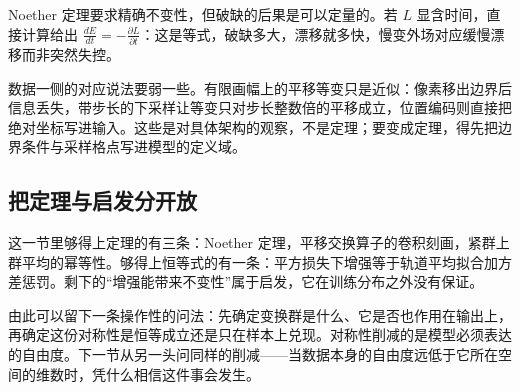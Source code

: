 Noether 定理要求精确不变性，但破缺的后果是可以定量的。若 \(L\) 显含时间，直接计算给出 \(\frac{dE}{dt}=-\frac{\partial L}{\partial t}\)：这是等式，破缺多大，漂移就多快，慢变外场对应缓慢漂移而非突然失控。

\begin{remark}
数据一侧的对应说法要弱一些。有限画幅上的平移等变只是近似：像素移出边界后信息丢失，带步长的下采样让等变只对步长整数倍的平移成立，位置编码则直接把绝对坐标写进输入。这些是对具体架构的观察，不是定理；要变成定理，得先把边界条件与采样格点写进模型的定义域。
\end{remark}

\subsection{把定理与启发分开放}

这一节里够得上定理的有三条：Noether 定理，平移交换算子的卷积刻画，紧群上群平均的幂等性。够得上恒等式的有一条：平方损失下增强等于轨道平均拟合加方差惩罚。剩下的``增强能带来不变性''属于启发，它在训练分布之外没有保证。

由此可以留下一条操作性的问法：先确定变换群是什么、它是否也作用在输出上，再确定这份对称性是恒等成立还是只在样本上兑现。对称性削减的是模型必须表达的自由度。下一节从另一头问同样的削减——当数据本身的自由度远低于它所在空间的维数时，凭什么相信这件事会发生。
